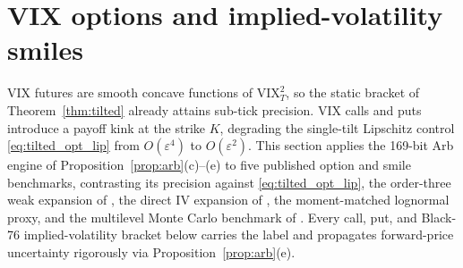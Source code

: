 \section{VIX options and implied-volatility smiles}\label{sec:vix_options}

VIX futures are smooth concave functions of $\mathrm{VIX}_T^2$, so the static \RoughCertTilt{} bracket of
Theorem~\ref{thm:tilted} already attains sub-tick precision. VIX calls and puts introduce a payoff kink
at the strike $K$, degrading the single-tilt Lipschitz control \eqref{eq:tilted_opt_lip} from
$O(\varepsilon^4)$ to $O(\varepsilon^2)$. This section applies the 169-bit Arb \RoughCertCV{} engine of
Proposition~\ref{prop:arb}(c)--(e) to five published option and smile benchmarks, contrasting its precision
against \eqref{eq:tilted_opt_lip}, the order-three weak expansion of \citet{BourgeyDeMarcoGobet2023}, the
direct IV expansion of \citet{LiaoAgarwalBourgey2026}, the moment-matched lognormal proxy, and the multilevel
Monte Carlo benchmark of \citet{BourgeyDeMarco2022}. Every call, put, and Black-76 implied-volatility bracket
below carries the label  and propagates forward-price uncertainty rigorously via
Proposition~\ref{prop:arb}(e).

